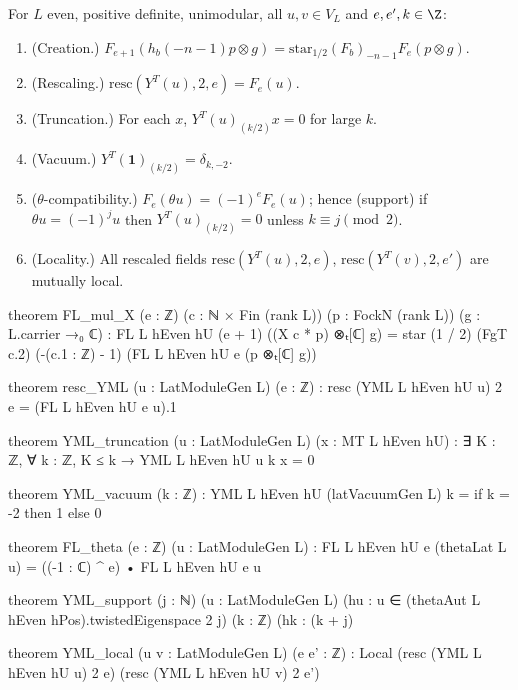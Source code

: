 \begin{theorem}\label{ch08:thm:YML}
For $L$ even, positive definite, unimodular, all $u,v\in V_L$ and $e,e',k\in\Z$:
\begin{enumerate}
\item (Creation.) $F_{e+1}(h_b(-n-1)p\otimes g)=\mathrm{star}_{1/2}(F_b)_{-n-1}F_e(p\otimes g)$.
\item (Rescaling.) $\mathrm{resc}(Y^T(u),2,e)=F_e(u)$.
\item (Truncation.) For each $x$, $Y^T(u)_{(k/2)}x=0$ for large $k$.
\item (Vacuum.) $Y^T(\mathbf 1)_{(k/2)}=\delta_{k,-2}$.
\item ($\theta$-compatibility.) $F_e(\theta u)=(-1)^eF_e(u)$; hence (support) if $\theta u=(-1)^ju$
  then $Y^T(u)_{(k/2)}=0$ unless $k\equiv j\pmod 2$.
\item (Locality.) All rescaled fields $\mathrm{resc}(Y^T(u),2,e)$, $\mathrm{resc}(Y^T(v),2,e')$ are
  mutually local.
\end{enumerate}
\end{theorem}
\begin{leancode}
theorem FL_mul_X (e : ℤ) (c : ℕ × Fin (rank L)) (p : FockN (rank L)) (g : L.carrier →₀ ℂ) :
    FL L hEven hU (e + 1) ((X c * p) ⊗ₜ[ℂ] g)
      = star (1 / 2) (FgT c.2) (-(c.1 : ℤ) - 1) (FL L hEven hU e (p ⊗ₜ[ℂ] g))

theorem resc_YML (u : LatModuleGen L) (e : ℤ) : resc (YML L hEven hU u) 2 e = (FL L hEven hU e u).1

theorem YML_truncation (u : LatModuleGen L) (x : MT L hEven hU) :
    ∃ K : ℤ, ∀ k : ℤ, K ≤ k → YML L hEven hU u k x = 0

theorem YML_vacuum (k : ℤ) :
    YML L hEven hU (latVacuumGen L) k = if k = -2 then 1 else 0

theorem FL_theta (e : ℤ) (u : LatModuleGen L) :
    FL L hEven hU e (thetaLat L u) = ((-1 : ℂ) ^ e) • FL L hEven hU e u

theorem YML_support (j : ℕ) (u : LatModuleGen L)
    (hu : u ∈ (thetaAut L hEven hPos).twistedEigenspace 2 j) (k : ℤ)
    (hk : (k + j) %

theorem YML_local (u v : LatModuleGen L) (e e' : ℤ) :
    Local (resc (YML L hEven hU u) 2 e) (resc (YML L hEven hU v) 2 e')
\end{leancode}

